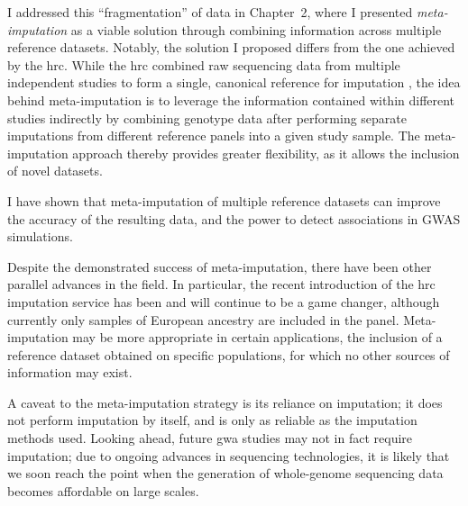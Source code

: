 I addressed this ``fragmentation'' of data in Chapter~2, where I presented \emph{meta-imputation} as a viable solution through combining information across multiple reference datasets.
Notably, the solution I proposed differs from the one achieved by the \gls{hrc}.
While the \gls{hrc} combined raw sequencing data from multiple independent studies to form a single, canonical reference for imputation \citep{McCarthy:2016gs}, the idea behind meta-imputation is to leverage the information contained within different studies indirectly by combining genotype data after performing separate imputations from different reference panels into a given study sample.
The meta-imputation approach thereby provides greater flexibility, as it allows the inclusion of novel datasets.

I have shown that meta-imputation of multiple reference datasets can improve the accuracy of the resulting data, and the power to detect associations in GWAS simulations.

Despite the demonstrated success of meta-imputation, there have been other parallel advances in the field.
In particular, the recent introduction of the \gls{hrc} imputation service has been and will continue to be a game changer, although currently only samples of European ancestry are included in the panel.
Meta-imputation may be more appropriate in certain applications, \eg the inclusion of a reference dataset obtained on specific populations, for which no other sources of information may exist.

A caveat to the meta-imputation strategy is its reliance on imputation; it does not perform imputation by itself, and is only as reliable as the imputation methods used.
Looking ahead, future \gls{gwa} studies may not in fact require imputation; due to ongoing advances in sequencing technologies, it is likely that we soon reach the point when the generation of whole-genome sequencing data becomes affordable on large scales.



